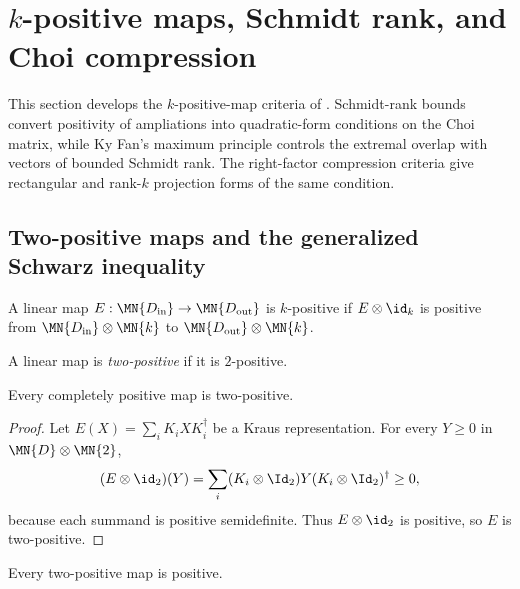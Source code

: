 \section{$k$-positive maps, Schmidt rank, and Choi compression}

This section develops the $k$-positive-map criteria of
\cite[Chapter~3]{Wolf2012Quantum}. Schmidt-rank bounds convert positivity of
ampliations into quadratic-form conditions on the Choi matrix, while Ky
Fan's maximum principle controls the extremal overlap with vectors of bounded
Schmidt rank. The right-factor compression criteria give rectangular and
rank-$k$ projection forms of the same condition.

\subsection{Two-positive maps and the generalized Schwarz inequality}

\begin{definition}\label{def:k_positive_map}
    \leanok
    A linear map
    $E : \MN{D_{\rm in}} \to \MN{D_{\rm out}}$ is $k$-positive if
    $E \otimes \id_{k}$ is positive from
    $\MN{D_{\rm in}} \otimes \MN{k}$ to
    $\MN{D_{\rm out}} \otimes \MN{k}$.
\end{definition}

\begin{definition}
    \label{def:2positive_map}
    \leanok
    A linear map is \emph{two-positive} if it is $2$-positive.
\end{definition}

\begin{theorem}
    \label{thm:cp_implies_two_positive}
    \leanok
    Every completely positive map is two-positive.
\end{theorem}

\begin{proof}
    \leanok
    Let $E(X)=\sum_i K_iXK_i^\dagger$ be a Kraus representation. For every
    $Y\geq0$ in $\MN{D}\otimes\MN{2}$,
    \[
        (E\otimes\id_2)(Y)
        =\sum_i (K_i\otimes\Id_2)Y(K_i\otimes\Id_2)^\dagger\geq0,
    \]
    because each summand is positive semidefinite. Thus
    $E\otimes\id_2$ is positive, so $E$ is two-positive.
\end{proof}

\begin{theorem}
    \label{thm:two_positive_implies_positive}
    \leanok
    Every two-positive map is positive.
\end{theorem}

